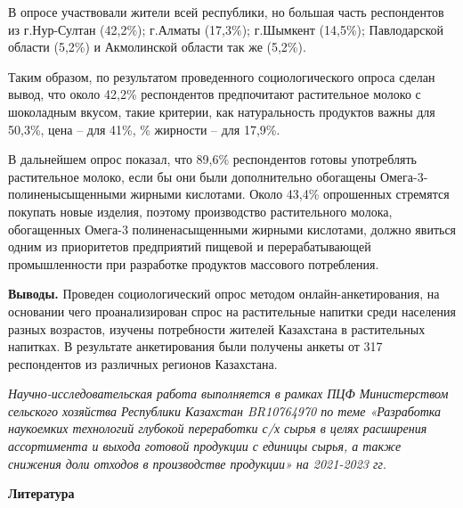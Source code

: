 \begin{multicols}{2}
В опросе участвовали жители всей республики, но большая часть
респондентов из г.Нур-Султан (42,2\%); г.Алматы (17,3\%); г.Шымкент
(14,5\%); Павлодарской области (5,2\%) и Акмолинской области так же
(5,2\%).

Таким образом, по результатом проведенного социологического опроса
сделан вывод, что около 42,2\% респондентов предпочитают растительное
молоко с шоколадным вкусом, такие критерии, как натуральность продуктов
важны для 50,3\%, цена -- для 41\%, \% жирности -- для 17,9\%.

В дальнейшем опрос показал, что 89,6\% респондентов готовы употреблять
растительное молоко, если бы они были дополнительно обогащены
Омега-3-полиненысыщенными жирными кислотами. Около 43,4\% опрошенных
стремятся покупать новые изделия, поэтому производство растительного
молока, обогащенных Омега-3 полиненасыщенными жирными кислотами, должно
явиться одним из приоритетов предприятий пищевой и перерабатывающей
промышленности при разработке продуктов массового потребления.

{\bfseries Выводы.} Проведен социологический опрос методом
онлайн-анкетирования, на основании чего проанализирован спрос на
растительные напитки среди населения разных возрастов, изучены
потребности жителей Казахстана в растительных напитках. В результате
анкетирования были получены анкеты от 317 респондентов из различных
регионов Казахстана.

\emph{Научно-исследовательская работа выполняется в рамках ПЦФ
Министерством сельского хозяйства Республики Казахстан BR10764970 по
теме «Разработка наукоемких технологий глубокой переработки с/х сырья в
целях расширения ассортимента и выхода готовой продукции с единицы
сырья, а также снижения доли отходов в производстве продукции» на
2021-2023 гг}.
\end{multicols}

{\bfseries Литература}

